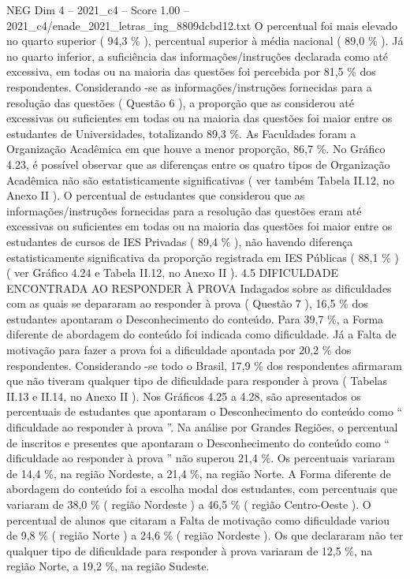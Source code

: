 \begin{textsample}{NEG Dim 4 – 2021\_c4 – Score 1.00 – 2021\_c4/enade\_2021\_letras\_ing\_8809dcbd12.txt}
O percentual foi mais elevado no quarto superior ( 94,3 \% ), percentual superior à média nacional ( 89,0 \% ).
Já no quarto inferior, a suficiência das informações/instruções declarada como até excessiva, em todas ou na maioria das questões foi percebida por 81,5 \% dos respondentes.
Considerando -se as informações/instruções fornecidas para a resolução das questões ( Questão 6 ), a proporção que as considerou até excessivas ou suficientes em todas ou na maioria das questões foi maior entre os estudantes de Universidades, totalizando 89,3 \%.
As Faculdades foram a Organização Acadêmica em que houve a menor proporção, 86,7 \%.
No Gráfico 4.23, é possível observar que as diferenças entre os quatro tipos de Organização Acadêmica não são estatisticamente significativas ( ver também Tabela II.12, no Anexo II ).
O percentual de estudantes que considerou que as informações/instruções fornecidas para a resolução das questões eram até excessivas ou suficientes em todas ou na maioria das questões foi maior entre os estudantes de cursos de IES Privadas ( 89,4 \% ), não havendo diferença estatisticamente significativa da proporção registrada em IES Públicas ( 88,1 \% ) ( ver Gráfico 4.24 e Tabela II.12, no Anexo II ). 4.5 DIFICULDADE ENCONTRADA AO RESPONDER À PROVA Indagados sobre as dificuldades com as quais se depararam ao responder à prova ( Questão 7 ), 16,5 \% dos estudantes apontaram o Desconhecimento do conteúdo.
Para 39,7 \%, a Forma diferente de abordagem do conteúdo foi indicada como dificuldade.
Já a Falta de motivação para fazer a prova foi a dificuldade apontada por 20,2 \% dos respondentes.
Considerando -se todo o Brasil, 17,9 \% dos respondentes afirmaram que não tiveram qualquer tipo de dificuldade para responder à prova ( Tabelas II.13 e II.14, no Anexo II ).
Nos Gráficos 4.25 a 4.28, são apresentados os percentuais de estudantes que apontaram o Desconhecimento do conteúdo como “ dificuldade ao responder à prova ”.
Na análise por Grandes Regiões, o percentual de inscritos e presentes que apontaram o Desconhecimento do conteúdo como “ dificuldade ao responder à prova ” não superou 21,4 \%.
Os percentuais variaram de 14,4 \%, na região Nordeste, a 21,4 \%, na região Norte.
A Forma diferente de abordagem do conteúdo foi a escolha modal dos estudantes, com percentuais que variaram de 38,0 \% ( região Nordeste ) a 46,5 \% ( região Centro-Oeste ).
O percentual de alunos que citaram a Falta de motivação como dificuldade variou de 9,8 \% ( região Norte ) a 24,6 \% ( região Nordeste ).
Os que declararam não ter qualquer tipo de dificuldade para responder à prova variaram de 12,5 \%, na região Norte, a 19,2 \%, na região Sudeste.

\end{textsample}
